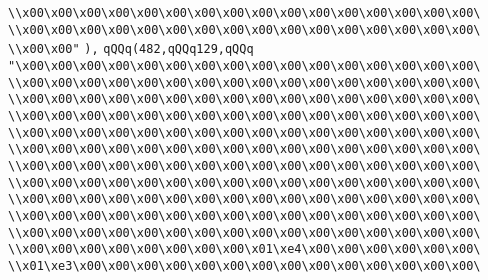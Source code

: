 \verb|\\x00\x00\x00\x00\x00\x00\x00\x00\x00\x00\x00\x00\x00\x00\x00\x00\|\newline
\verb|\\x00\x00\x00\x00\x00\x00\x00\x00\x00\x00\x00\x00\x00\x00\x00\x00\|\newline
\verb|\\x00\x00"|\newline
\verb|),|\newline
\verb|qQQq(482,qQQq129,qQQq|\newline
\verb|"\x00\x00\x00\x00\x00\x00\x00\x00\x00\x00\x00\x00\x00\x00\x00\x00\|\newline
\verb|\\x00\x00\x00\x00\x00\x00\x00\x00\x00\x00\x00\x00\x00\x00\x00\x00\|\newline
\verb|\\x00\x00\x00\x00\x00\x00\x00\x00\x00\x00\x00\x00\x00\x00\x00\x00\|\newline
\verb|\\x00\x00\x00\x00\x00\x00\x00\x00\x00\x00\x00\x00\x00\x00\x00\x00\|\newline
\verb|\\x00\x00\x00\x00\x00\x00\x00\x00\x00\x00\x00\x00\x00\x00\x00\x00\|\newline
\verb|\\x00\x00\x00\x00\x00\x00\x00\x00\x00\x00\x00\x00\x00\x00\x00\x00\|\newline
\verb|\\x00\x00\x00\x00\x00\x00\x00\x00\x00\x00\x00\x00\x00\x00\x00\x00\|\newline
\verb|\\x00\x00\x00\x00\x00\x00\x00\x00\x00\x00\x00\x00\x00\x00\x00\x00\|\newline
\verb|\\x00\x00\x00\x00\x00\x00\x00\x00\x00\x00\x00\x00\x00\x00\x00\x00\|\newline
\verb|\\x00\x00\x00\x00\x00\x00\x00\x00\x00\x00\x00\x00\x00\x00\x00\x00\|\newline
\verb|\\x00\x00\x00\x00\x00\x00\x00\x00\x00\x00\x00\x00\x00\x00\x00\x00\|\newline
\verb|\\x00\x00\x00\x00\x00\x00\x00\x00\x01\xe4\x00\x00\x00\x00\x00\x00\|\newline
\verb|\\x01\xe3\x00\x00\x00\x00\x00\x00\x00\x00\x00\x00\x00\x00\x00\x00\|\newline
